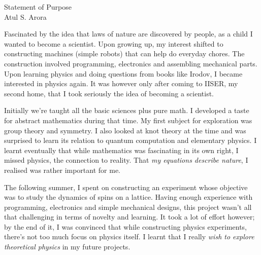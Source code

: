 \setlength{\oddsidemargin}{-0.4in}
\setlength{\evensidemargin}{0in}
\setlength{\textwidth}{7.0in}
\setlength{\topmargin}{-1.1in}
\setlength{\textheight}{11in}
\pagestyle{empty}



\begin{center}
{\Large Statement of Purpose} \\[.1in]
{\large Atul S. Arora}
\end{center}

\vspace*{.1in}
Fascinated by the idea that laws of nature are discovered by people, as a child I wanted to become a scientist. Upon growing up, my interest shifted to constructing machines (simple robots) that can help do everyday chores. The construction involved programming, electronics and assembling mechanical parts. Upon learning physics and doing questions from books like Irodov, I became interested in physics again. It was however only after coming to IISER, my second home, that I took seriously the idea of becoming a scientist. 


Initially we're taught all the basic sciences plus pure math. I developed a taste for abstract mathematics during that time. My first subject for exploration was group theory and symmetry. I also looked at knot theory at the time and was surprised to learn its relation to quantum computation and elementary physics. I learnt eventually that while mathematics was fascinating in its own right, I missed physics, the connection to reality. That \emph{my equations describe nature}, I realised was rather important for me.


The following summer, I spent on constructing an experiment whose objective was to study the dynamics of spins on a lattice. Having enough experience with programming, electronics and simple mechanical designs, this project wasn't all that challenging in terms of novelty and learning. It took a lot of effort however; by the end of it, I was convinced that while constructing physics experiments, there's not too much focus on physics itself. I learnt that I really \emph{wish to explore theoretical physics} in my future projects.


